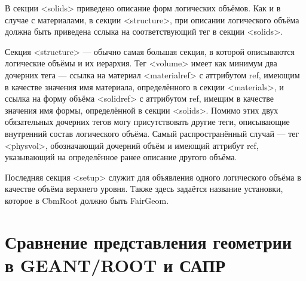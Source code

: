 В секции <solids> приведено описание форм логических объёмов. Как и в случае с материалами, в секции <structure>, при описании логического объёма должна быть приведена сслыка на соответствующий тег в секции <solids>.

Секция <structure> --- обычно самая большая секция, в которой описываются логические объёмы и их иерархия. Тег <volume> имеет как минимум два дочерних тега --- ссылка на материал <materialref> с аттрибутом ref, имеющим в качестве значения имя материала, определённого в секции <materials>, и ссылка на форму объёма <solidref> с аттрибутом ref, имещим в качестве значения имя формы, определённой в секции <solids>. Помимо этих двух обязательных дочерних тегов могу присутствовать другие теги, описывающие внутренний состав логического объёма. Самый распространённый случай --- тег <physvol>, обозначающий дочерний объём и имеющий аттрибут ref, указывающий на определённое ранее описание другого объёма.

Последняя секция <setup> служит для объявления одного логического объёма в качестве объёма верхнего уровня. Также здесь задаётся название установки, которое в CbmRoot должно быть FairGeom.

%                                                       

\section{Сравнение представления геометрии в GEANT/ROOT и САПР}\label{sec:secROOTvsCAD}

